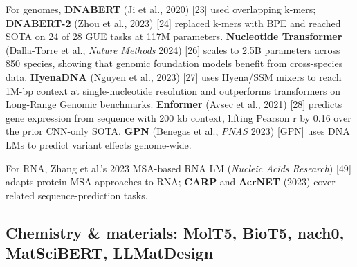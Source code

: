 For genomes, \textbf{DNABERT} (Ji et al., 2020) {[}23{]} used overlapping k-mers; \textbf{DNABERT-2} (Zhou et al., 2023) {[}24{]} replaced k-mers with BPE and reached SOTA on 24 of 28 GUE tasks at 117M parameters. \textbf{Nucleotide Transformer} (Dalla-Torre et al., \emph{Nature Methods} 2024) {[}26{]} scales to 2.5B parameters across 850 species, showing that genomic foundation models benefit from cross-species data. \textbf{HyenaDNA} (Nguyen et al., 2023) {[}27{]} uses Hyena/SSM mixers to reach 1M-bp context at single-nucleotide resolution and outperforms transformers on Long-Range Genomic benchmarks. \textbf{Enformer} (Avsec et al., 2021) {[}28{]} predicts gene expression from sequence with 200 kb context, lifting Pearson r by 0.16 over the prior CNN-only SOTA. \textbf{GPN} (Benegas et al., \emph{PNAS} 2023) {[}GPN{]} uses DNA LMs to predict variant effects genome-wide.

For RNA, Zhang et al.'s 2023 MSA-based RNA LM (\emph{Nucleic Acids Research}) {[}49{]} adapts protein-MSA approaches to RNA; \textbf{CARP} and \textbf{AcrNET} (2023) cover related sequence-prediction tasks.

\subsection{Chemistry \& materials: MolT5, BioT5, nach0, MatSciBERT, LLMatDesign}\label{chemistry-materials-molt5-biot5-nach0-matscibert-llmatdesign}

